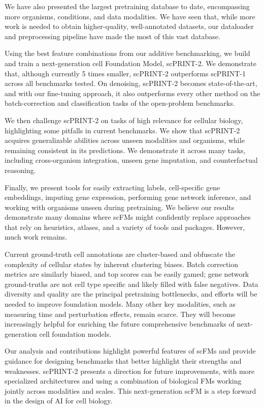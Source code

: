 We have also presented the largest pretraining database to date,
encompassing more organisms, conditions, and data modalities. We have
seen that, while more work is needed to obtain higher-quality,
well-annotated datasets, our dataloader and preprocessing pipeline have
made the most of this vast database.

Using the best feature combinations from our additive benchmarking, we
build and train a next-generation cell Foundation Model, \gls{scPRINT}-2. We
demonstrate that, although currently 5 times smaller, \gls{scPRINT}-2
outperforms \gls{scPRINT}-1 across all benchmarks tested. On denoising,
\gls{scPRINT}-2 becomes state-of-the-art, and with our fine-tuning approach,
it also outperforms every other method on the batch-correction and
classification tasks of the open-problem benchmarks.

We then challenge \gls{scPRINT}-2 on tasks of high relevance for cellular
biology, highlighting some pitfalls in current benchmarks. We show that
\gls{scPRINT}-2 acquires generalizable abilities across unseen modalities and
organisms, while remaining consistent in its predictions. We demonstrate
it across many tasks, including cross-organism integration, unseen gene
imputation, and counterfactual reasoning.

Finally, we present tools for easily extracting labels, cell-specific
gene embeddings, imputing gene expression, performing gene network
inference, and working with organisms unseen during pretraining. We
believe our results demonstrate many domains where \gls{scFM}s might
confidently replace approaches that rely on heuristics, atlases, and a
variety of tools and packages. However, much work remains.

Current ground-truth cell annotations are cluster-based and obfuscate
the complexity of cellular states by inherent clustering biases. Batch
correction metrics are similarly biased, and top scores can be easily
gamed; gene network ground-truths are not cell type specific and likely
filled with false negatives. Data diversity and quality are the
principal pretraining bottlenecks, and efforts will be needed to
improve foundation models. Many other key modalities, such as measuring
time and perturbation effects, remain scarce. They will become
increasingly helpful for enriching the future comprehensive benchmarks
of next-generation cell foundation models.

Our analysis and contributions highlight powerful features of \gls{scFM}s and
provide guidance for designing benchmarks that better highlight their
strengths and weaknesses. \gls{scPRINT}-2 presents a direction for future
improvements, with more specialized architectures and using a
combination of biological FMs working jointly across modalities and
scales. This next-generation \gls{scFM} is a step forward in the design of AI
for cell biology.
